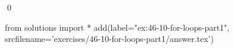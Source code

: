 
\begin{ex}
  \label{ex:46-10-for-loops-part1}
  
  \qed
\end{ex}
\begin{python0}
from solutions import *
add(label="ex:46-10-for-loops-part1",
    srcfilename='exercises/46-10-for-loops-part1/answer.tex')
\end{python0}
